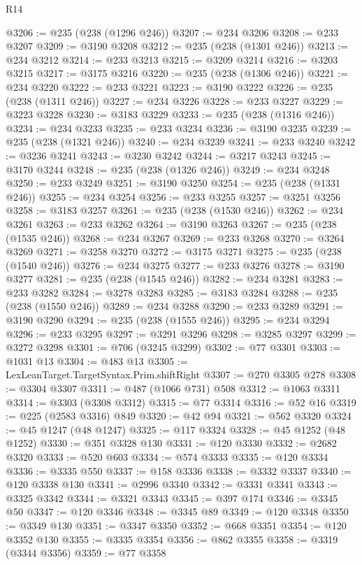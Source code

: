 \begin{lexlean}{R14}
\begin{coremodule}
@3206 := @235 (@238 (@1296 @246))
@3207 := @234 @3206
@3208 := @233 @3207
@3209 := @3190 @3208
@3212 := @235 (@238 (@1301 @246))
@3213 := @234 @3212
@3214 := @233 @3213
@3215 := @3209 @3214
@3216 := @3203 @3215
@3217 := @3175 @3216
@3220 := @235 (@238 (@1306 @246))
@3221 := @234 @3220
@3222 := @233 @3221
@3223 := @3190 @3222
@3226 := @235 (@238 (@1311 @246))
@3227 := @234 @3226
@3228 := @233 @3227
@3229 := @3223 @3228
@3230 := @3183 @3229
@3233 := @235 (@238 (@1316 @246))
@3234 := @234 @3233
@3235 := @233 @3234
@3236 := @3190 @3235
@3239 := @235 (@238 (@1321 @246))
@3240 := @234 @3239
@3241 := @233 @3240
@3242 := @3236 @3241
@3243 := @3230 @3242
@3244 := @3217 @3243
@3245 := @3170 @3244
@3248 := @235 (@238 (@1326 @246))
@3249 := @234 @3248
@3250 := @233 @3249
@3251 := @3190 @3250
@3254 := @235 (@238 (@1331 @246))
@3255 := @234 @3254
@3256 := @233 @3255
@3257 := @3251 @3256
@3258 := @3183 @3257
@3261 := @235 (@238 (@1530 @246))
@3262 := @234 @3261
@3263 := @233 @3262
@3264 := @3190 @3263
@3267 := @235 (@238 (@1535 @246))
@3268 := @234 @3267
@3269 := @233 @3268
@3270 := @3264 @3269
@3271 := @3258 @3270
@3272 := @3175 @3271
@3275 := @235 (@238 (@1540 @246))
@3276 := @234 @3275
@3277 := @233 @3276
@3278 := @3190 @3277
@3281 := @235 (@238 (@1545 @246))
@3282 := @234 @3281
@3283 := @233 @3282
@3284 := @3278 @3283
@3285 := @3183 @3284
@3288 := @235 (@238 (@1550 @246))
@3289 := @234 @3288
@3290 := @233 @3289
@3291 := @3190 @3290
@3294 := @235 (@238 (@1555 @246))
@3295 := @234 @3294
@3296 := @233 @3295
@3297 := @3291 @3296
@3298 := @3285 @3297
@3299 := @3272 @3298
@3301 := @706 (@3245 @3299)
@3302 := @77 @3301
@3303 := @1031 @13
@3304 := @483 @13
@3305 := LexLeanTarget.TargetSyntax.Prim.shiftRight
@3307 := @270 @3305 @278
@3308 := @3304 @3307
@3311 := @487 (@1066 @731) @508
@3312 := @1063 @3311
@3314 := @3303 (@3308 @3312)
@3315 := @77 @3314
@3316 := @52 @16
@3319 := @225 (@2583 @3316) @849
@3320 := @42 @94
@3321 := @562 @3320
@3324 := @45 @1247 (@48 @1247)
@3325 := @117 @3324
@3328 := @45 @1252 (@48 @1252)
@3330 := @351 @3328 @130
@3331 := @120 @3330
@3332 := @2682 @3320
@3333 := @520 @603
@3334 := @574 @3333
@3335 := @120 @3334
@3336 := @3335 @550
@3337 := @158 @3336
@3338 := @3332 @3337
@3340 := @120 @3338 @130
@3341 := @2996 @3340
@3342 := @3331 @3341
@3343 := @3325 @3342
@3344 := @3321 @3343
@3345 := @397 @174
@3346 := @3345 @50
@3347 := @120 @3346
@3348 := @3345 @89
@3349 := @120 @3348
@3350 := @3349 @130
@3351 := @3347 @3350
@3352 := @668 @3351
@3354 := @120 @3352 @130
@3355 := @3335 @3354
@3356 := @862 @3355
@3358 := @3319 (@3344 @3356)
@3359 := @77 @3358

\end{coremodule}
\end{lexlean}
